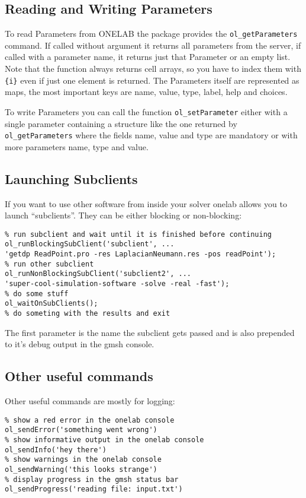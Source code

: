 \documentclass[article,english,colorback,accentcolor=tud9b,11pt]{tudreport}
\begin{document}
		\subsection{Reading and Writing Parameters}
		To read Parameters from ONELAB the package provides the \texttt{ol\_getParameters} command. If called without argument it returns all parameters from the server, if called with a parameter name, it returns just that Parameter or an empty list. Note that the function always returns cell arrays, so you have to index them with \texttt{\{i\}} even if just one element is returned. The Parameters itself are represented as maps, the most important keys are name, value, type, label, help and choices.

		To write Parameters you can call the function \texttt{ol\_setParameter} either with a single parameter containing a structure like the one returned by \texttt{ol\_getParameters} where the fields name, value and type are mandatory or with more parameters name, type and value.
		\subsection{Launching Subclients}
		If you want to use other software from inside your solver onelab allows you to launch ``subclients''. They can be either blocking or non-blocking:
		\begin{lstlisting} 
% run subclient and wait until it is finished before continuing
ol_runBlockingSubClient('subclient', ...
'getdp ReadPoint.pro -res LaplacianNeumann.res -pos readPoint');
% run other subclient
ol_runNonBlockingSubClient('subclient2', ...
'super-cool-simulation-software -solve -real -fast');
% do some stuff
ol_waitOnSubClients();
% do someting with the results and exit
		\end{lstlisting}
		The first parameter is the name the subclient gets passed and is also prepended to it's debug output in the gmsh console.

		\subsection{Other useful commands}
		Other useful commands are mostly for logging:
		\begin{lstlisting}
% show a red error in the onelab console 
ol_sendError('something went wrong')
% show informative output in the onelab console
ol_sendInfo('hey there')
% show warnings in the onelab console
ol_sendWarning('this looks strange')
% display progress in the gmsh status bar
ol_sendProgress('reading file: input.txt')
		\end{lstlisting}
\end{document}
